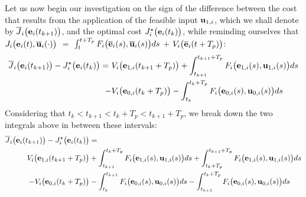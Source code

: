 Let us now begin our investigation on the sign of the difference between the cost
that results from the application of the feasible input $\bm{\mathbf{u}}_{1,i}$,
which we shall denote by $\overline{J}_i\big(\bm{\mathbf{e}}_i(t_{k+1})\big)$,
and the optimal cost $J_i^{\star}\big(\bm{\mathbf{e}}_i(t_k)\big)$, while reminding
ourselves that
$J_i \big(\bm{\mathbf{e}}_i(t), \overline{\bm{\mathbf{u}}}_i (\cdot)\big)$ $=$
$\int_{t}^{t + T_p} F_i \big(\overline{\bm{\mathbf{e}}}_i(s), \overline{\bm{\mathbf{u}}}_i (s)\big) ds$ $+$
$V_i \big(\overline{\bm{\mathbf{e}}}_i (t + T_p)\big)$:
\begin{align}
  \overline{J}_i\big(\bm{\mathbf{e}}_i(t_{k+1})\big) - J_i^{\star}\big(\bm{\mathbf{e}}_i(t_k)\big) =\
   & V_i \big(\bm{\mathbf{e}}_{1,i} (t_{k+1} + T_p)\big) + \int_{t_{k+1}}^{t_{k+1} + T_p} F_i \big(\bm{\mathbf{e}}_{1,i}(s), \bm{\mathbf{u}}_{1,i} (s)\big) ds \\
  -&V_i \big(\bm{\mathbf{e}}_{0,i} (t_k + T_p)\big) - \int_{t_k}^{t_k + T_p} F_i \big(\bm{\mathbf{e}}_{0,i}(s), \bm{\mathbf{u}}_{0,i} (s)\big) ds
\end{align}
Considering that $t_k < t_{k+1} < t_k + T_p < t_{k+1} + T_p$, we break down the
two integrals above in between these intervals:
\begin{align}
  \overline{J}_i\big(\bm{\mathbf{e}}_i(t_{k+1})\big) - J_i^{\star}\big(\bm{\mathbf{e}}_i(t_k)\big) &= \\
    V_i \big(\bm{\mathbf{e}}_{1,i} (t_{k+1} + T_p)\big)
    &+ \int_{t_{k+1}}^{t_k + T_p} F_i \big(\bm{\mathbf{e}}_{1,i}(s), \bm{\mathbf{u}}_{1,i} (s)\big) d s
    + \int_{t_k + T_p}^{t_{k+1} + T_p} F_i \big(\bm{\mathbf{e}}_{1,i}(s), \bm{\mathbf{u}}_{1,i} (s)\big) d s \\
    -V_i \big(\bm{\mathbf{e}}_{0,i} (t_k + T_p)\big)
    &- \int_{t_k}^{t_{k+1}} F_i \big(\bm{\mathbf{e}}_{0,i}(s), \bm{\mathbf{u}}_{0,i} (s)\big) d s
    - \int_{t_{k+1}}^{t_k + T_p} F_i \big(\bm{\mathbf{e}}_{0,i}(s), \bm{\mathbf{u}}_{0,i} (s)\big) d s
\label{eq:convergence_4_integrals_2}
\end{align}



